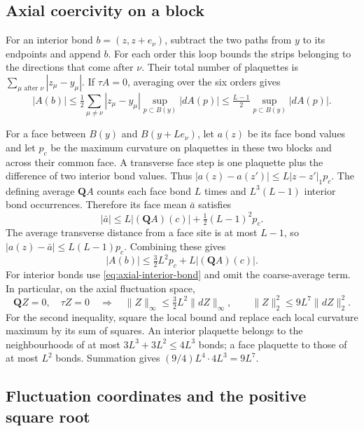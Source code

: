 \subsection{Axial coercivity on a block}\label{subsec:photon-axial-coercivity}

For an interior bond $b=(z,z+e_\nu)$, subtract the two
paths from $y$ to its endpoints and append $b$. For each order this
loop bounds the strips belonging to the directions that come after
$\nu$. Their total number of plaquettes is
$\sum_{\mu\text{ after }\nu}|z_\mu-y_\mu|$. If $\tau A=0$,
averaging over the six orders gives
\begin{equation}\label{eq:axial-interior-bond}
 |A(b)|\le\tfrac12\sum_{\mu\ne\nu}|z_\mu-y_\mu|
           \sup_{p\subset B(y)}|dA(p)|
       \le\tfrac{L-1}{2}\sup_{p\subset B(y)}|dA(p)|.
\end{equation}

For a face between $B(y)$ and $B(y+Le_\nu)$, let $a(z)$ be its face
bond values and let $p_c$ be the maximum curvature on plaquettes in
these two blocks and across their common face. A transverse face step
is one plaquette plus the difference of two interior bond values.
Thus $|a(z)-a(z')|\le L|z-z'|_1p_c$.
The defining average $\mathbf QA$ counts each face bond $L$ times
and $L^3(L-1)$ interior bond occurrences. Therefore its face mean
$\bar a$ satisfies
\[
 |\bar a|\le L|(\mathbf QA)(c)|
                       +\tfrac12(L-1)^2p_c.
\]
The average transverse distance from a face site is at most $L-1$,
so $|a(z)-\bar a|\le L(L-1)p_c$. Combining these gives
\begin{equation}\label{eq:axial-local-bond-bound}
 |A(b)|\le\tfrac32L^2p_c+L|(\mathbf QA)(c)|.
\end{equation}
For interior bonds use \eqref{eq:axial-interior-bond} and omit the
coarse-average term. In particular, on the axial fluctuation space,
\begin{equation}\label{eq:axial-fluctuation-coercivity}
 \mathbf QZ=0,\quad\tau Z=0
     \quad\Longrightarrow\quad
 \|Z\|_\infty\le\tfrac32L^2\|dZ\|_\infty,\qquad
 \|Z\|_2^2\le9L^7\|dZ\|_2^2.
\end{equation}
For the second inequality, square the local bound and replace each
local curvature maximum by its sum of squares. An interior plaquette
belongs to the neighbourhoods of at most $3L^3+3L^2\le4L^3$ bonds;
a face plaquette to those of at most $L^2$ bonds. Summation gives
$(9/4)L^4\cdot4L^3=9L^7$.

\subsection{Fluctuation coordinates and the positive square root}
\label{subsec:photon-fluctuation-root}

